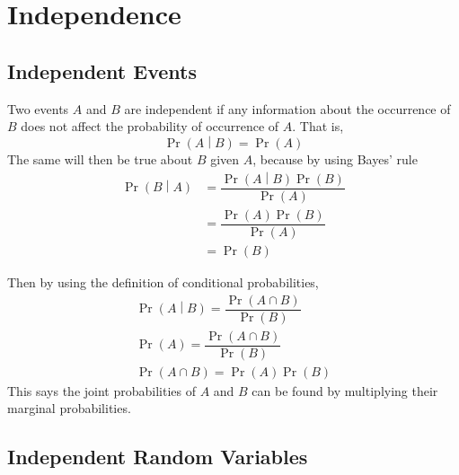 \documentclass[11pt]{report} %
\begin{document}
\section{Independence}

\subsection{Independent Events}

Two events $A$ and $B$ are independent if any information about the occurrence of $B$  does not affect the probability of occurrence of $A$. That is, 
\begin{equation}
\operatorname{Pr}\left(A\middle|B\right) = \operatorname{Pr}\left(A\right)
\end{equation}
The same will then be true about $B$ given $A$, because by using Bayes' rule
\begin{align}
\operatorname{Pr}\left(B\middle|A\right) &= \dfrac{\operatorname{Pr}\left(A\middle|B\right)\operatorname{Pr}\left(B\right)}{\operatorname{Pr}\left(A\right)} \\
&= \dfrac{\operatorname{Pr}\left(A\right)\operatorname{Pr}\left(B\right)}{\operatorname{Pr}\left(A\right)} \\
&= \operatorname{Pr}\left(B\right)
\end{align}

Then by using the definition of conditional probabilities,
\begin{gather}
\operatorname{Pr}\left(A\middle|B\right) = \dfrac{\operatorname{Pr}\left(A\cap B\right)}{\operatorname{Pr}\left(B\right)} \\
\operatorname{Pr}\left(A\right) = \dfrac{\operatorname{Pr}\left(A\cap B\right)}{\operatorname{Pr}\left(B\right)} \\
\operatorname{Pr}\left(A\cap B\right) = \operatorname{Pr}\left(A\right)\operatorname{Pr}\left(B\right)
\end{gather}
This says the joint probabilities of $A$ and $B$ can be found by multiplying their marginal probabilities.

\subsection{Independent Random Variables}
\end{document}
